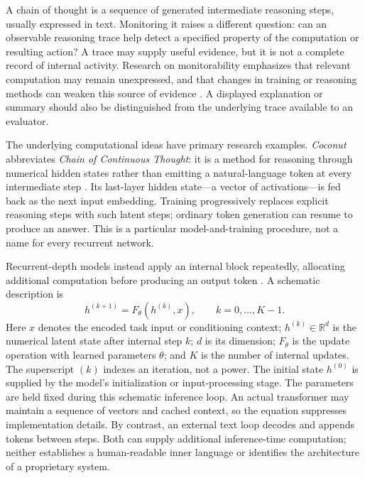 \documentclass[11pt,a4paper]{article}
\begin{document}
A chain of thought is a sequence of generated intermediate reasoning steps, usually expressed in text. Monitoring it raises a different question: can an observable reasoning trace help detect a specified property of the computation or resulting action? A trace may supply useful evidence, but it is not a complete record of internal activity. Research on monitorability emphasizes that relevant computation may remain unexpressed, and that changes in training or reasoning methods can weaken this source of evidence \citep{korbak2025}. A displayed explanation or summary should also be distinguished from the underlying trace available to an evaluator.

The underlying computational ideas have primary research examples. \emph{Coconut} abbreviates \emph{Chain of Continuous Thought}: it is a method for reasoning through numerical hidden states rather than emitting a natural-language token at every intermediate step \citep{hao2024}. Its last-layer hidden state---a vector of activations---is fed back as the next input embedding. Training progressively replaces explicit reasoning steps with such latent steps; ordinary token generation can resume to produce an answer. This is a particular model-and-training procedure, not a name for every recurrent network.

Recurrent-depth models instead apply an internal block repeatedly, allocating additional computation before producing an output token \citep{geiping2025}. A schematic description is
\begin{equation}
 h^{(k+1)}=F_\theta\!\left(h^{(k)},x\right),\qquad k=0,\ldots,K-1.
 \label{eq:latent-loop}
\end{equation}
Here $x$ denotes the encoded task input or conditioning context; $h^{(k)}\in\mathbb{R}^{d}$ is the numerical latent state after internal step $k$; $d$ is its dimension; $F_\theta$ is the update operation with learned parameters $\theta$; and $K$ is the number of internal updates. The superscript $(k)$ indexes an iteration, not a power. The initial state $h^{(0)}$ is supplied by the model's initialization or input-processing stage. The parameters are held fixed during this schematic inference loop. An actual transformer may maintain a sequence of vectors and cached context, so the equation suppresses implementation details. By contrast, an external text loop decodes and appends tokens between steps. Both can supply additional inference-time computation; neither establishes a human-readable inner language or identifies the architecture of a proprietary system.
\end{document}
